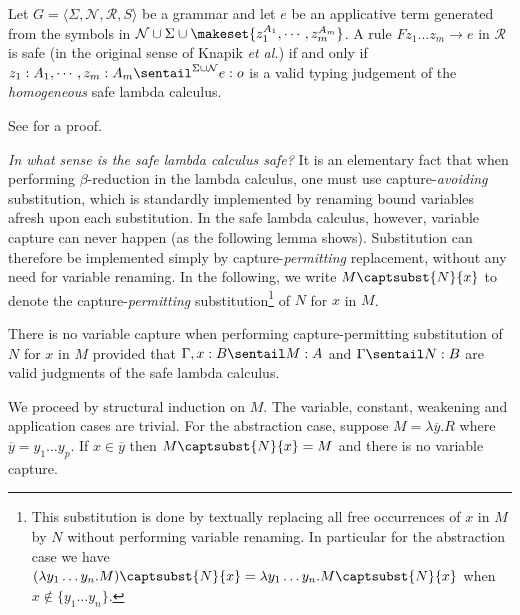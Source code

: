 \begin{proposition} Let $G = \langle \Sigma, \mathcal{N}, \mathcal{R},
  S \rangle$ be a grammar and let $e$ be an applicative term generated
  from the symbols in $\mathcal{N} \cup \Sigma \cup \makeset{z_1^{A_1},
    \cdots, z_m^{A_m}}$.  A rule $F z_1 \ldots z_m \rightarrow e$ in
  $\mathcal{R}$ is safe (in the original sense of Knapik \emph{et al.}) if and only if $ z_1 : A_1, \cdots, z_m : A_m
  \sentail^{\Sigma \cup \mathcal{N}} e : o$ is a valid typing judgement
  of the \emph{homogeneous} safe lambda calculus.
\end{proposition}
See \cite{demirandathesis} for a proof.

\emph{In what sense is the safe lambda calculus safe?} It is an
elementary fact that when performing $\beta$-reduction in the lambda
calculus, one must use capture-\emph{avoiding} substitution, which
is standardly implemented by renaming bound variables afresh upon
each substitution. In the safe lambda calculus, however, variable
capture can never happen (as the following lemma shows).
Substitution can therefore be implemented simply by
capture-\emph{permitting} replacement, without any need for variable
renaming. In the following, we write $M\captsubst{N}{x}$ to denote
the capture-\emph{permitting} substitution\footnote{This
substitution is done by textually replacing all free occurrences of
$x$ in $M$ by $N$ without performing variable renaming.  In
particular for the abstraction
  case we have
$(\lambda y_1\ldots y_n . M)\captsubst{N}{x} = \lambda y_1\ldots y_n . M\captsubst{N}{x}$ when $x\not\in
  \{ y_1\ldots y_n \}$.}
of $N$ for $x$ in $M$.

\begin{lemma}\label{lem:nvc}
\label{lem:nocapture} There is no variable capture when performing
capture-permitting substitution of $N$ for $x$ in $M$ provided that
$\Gamma, x:B \sentail M : A$ and $\Gamma \sentail  N : B$ are valid
judgments of the safe lambda calculus.
\end{lemma}

\proof
  We proceed by structural induction on $M$. The variable, constant, weakening and
  application cases are trivial. For the abstraction case, suppose $M = \lambda \overline{y}. R$ where $\overline{y} = y_1 \ldots y_p$. If $x \in \overline{y}$ then $M \captsubst{N}{x} = M$ and there is no variable capture.

